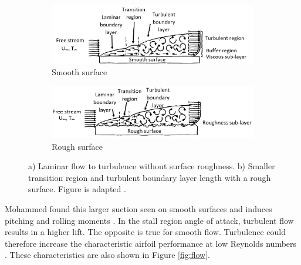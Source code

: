 \begin{figure}[H]
     \centering
     \begin{subfigure}[b]{\textwidth}
         \centering
         \includegraphics[width=\textwidth]{02_Background/Figs/smooth.JPG}
         \caption{Smooth surface}
         \label{fig:Pressoo2a}
     \end{subfigure}
     \hfill
     \begin{subfigure}[b]{\textwidth}
         \centering
         \includegraphics[width=\textwidth]{02_Background/Figs/rought.JPG}
         \caption{Rough surface}
         \label{fig:Pressoo2b}
     \end{subfigure}
     \hfill
         \caption{a) Laminar flow to turbulence without surface roughness. b) Smaller transition region and turbulent boundary layer length with a rough surface. Figure is adapted \cite{Choi2006}.}
  \label{fig:compare}
\end{figure}


Mohammed found this larger suction seen on smooth surfaces and induces pitching and rolling moments \cite{Mohamed2014}. In the stall region angle of attack, turbulent flow results in a higher lift. The opposite is true for smooth flow. Turbulence could therefore increase the characteristic airfoil performance at low Reynolds numbers \cite{Mohamed2014}. These characteristics are also shown in Figure \ref{fig:flow}.


